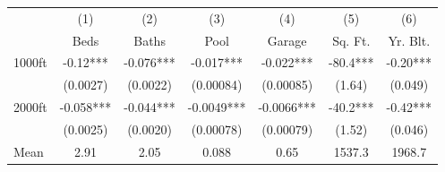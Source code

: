 {
\def\sym#1{\ifmmode^{#1}\else\(^{#1}\)\fi}
\begin{tabular}{l*{6}{c}}
\toprule
                    &\multicolumn{1}{c}{(1)}&\multicolumn{1}{c}{(2)}&\multicolumn{1}{c}{(3)}&\multicolumn{1}{c}{(4)}&\multicolumn{1}{c}{(5)}&\multicolumn{1}{c}{(6)}\\
                    &\multicolumn{1}{c}{Beds}&\multicolumn{1}{c}{Baths}&\multicolumn{1}{c}{Pool}&\multicolumn{1}{c}{Garage}&\multicolumn{1}{c}{Sq. Ft.}&\multicolumn{1}{c}{Yr. Blt.}\\
\midrule
1000ft              &       -0.12***&      -0.076***&      -0.017***&      -0.022***&       -80.4***&       -0.20***\\
                    &    (0.0027)   &    (0.0022)   &   (0.00084)   &   (0.00085)   &      (1.64)   &     (0.049)   \\
\addlinespace
2000ft              &      -0.058***&      -0.044***&     -0.0049***&     -0.0066***&       -40.2***&       -0.42***\\
                    &    (0.0025)   &    (0.0020)   &   (0.00078)   &   (0.00079)   &      (1.52)   &     (0.046)   \\
\midrule
Mean                &        2.91   &        2.05   &       0.088   &        0.65   &      1537.3   &      1968.7   \\
\bottomrule
\end{tabular}
}
